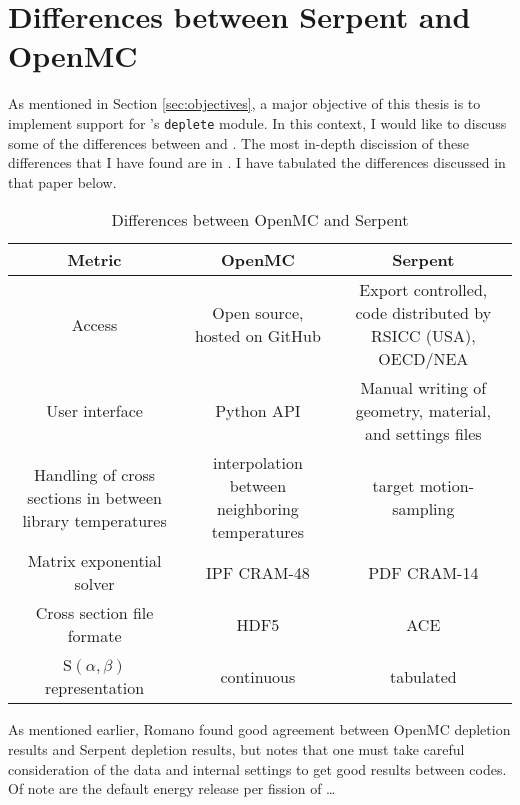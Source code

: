 \section{Differences between Serpent and OpenMC}
As mentioned in Section \ref{sec:objectives}, a major objective of this thesis
is to implement support for \OpenMC's \verb.deplete. module. In this context,
I would like to discuss some of the differences between \OpenMC and \SerpentTWO. The most in-depth discission of these differences that I have found are in \cite{romano_depletion_2021}. I have tabulated the differences discussed in that paper below.
\begin{table}[htpb] 
    \centering 
    \caption{Differences between OpenMC and Serpent} 
    \label{tab:mc_code_diffs}
    \begin{tabulary}{\linewidth}{|C|C|C|} 
        \hline
        Metric & OpenMC & Serpent \\ 
        \hline 
        Access & Open source, hosted on GitHub & Export controlled, code distributed by RSICC (USA), OECD/NEA\\
        \hline
        User interface & Python API & Manual writing of geometry, material, and settings files\\
        \hline 
        Handling of cross sections in between library temperatures & interpolation between neighboring temperatures & target motion-sampling \cite{viitanen_explicit_2012}\\
        \hline 
        Matrix exponential solver & IPF CRAM-48 & PDF CRAM-14 \\
        \hline
        Cross section file formate & HDF5 & ACE \\
        \hline
        S$(\alpha, \beta)$ representation & continuous & tabulated \\
        \hline
    \end{tabulary}
\end{table}
As mentioned earlier, Romano found good agreement between OpenMC depletion results and Serpent depletion results, but notes that one must take careful consideration of the data and internal settings to get good results between codes. Of note are the default energy release per fission of \ldots
